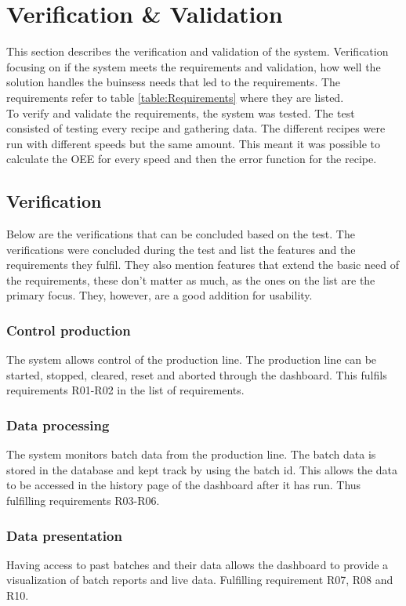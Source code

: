 \section{Verification \& Validation}
This section describes the verification and validation of the system. 
Verification focusing on if the system meets the requirements and validation, 
how well the solution handles the buinsess needs that led to the requirements.
The requirements refer to table \ref{table:Requirements} where they are listed. \\

To verify and validate the requirements, the system was tested. The test 
consisted of testing every recipe and gathering data. The different recipes were 
run with different speeds but the same amount. This meant it was possible to 
calculate the OEE for every speed and then the error function for the recipe. 

\subsection{Verification}
Below are the verifications that can be concluded based on the test. The 
verifications were concluded during the test and list the features and the 
requirements they fulfil. They also mention features that extend the basic need 
of the requirements, these don't matter as much, as the ones on the list are the 
primary focus. They, however, are a good addition for usability.

\subsubsection{Control production} 
The system allows control of the production line. The production line can be 
started, stopped, cleared, reset and aborted through the dashboard. This fulfils 
requirements R01-R02 in the list of requirements.

\subsubsection{Data processing}
The system monitors batch data from the production line. The batch data is 
stored in the database and kept track by using the batch id. This allows the 
data to be accessed in the history page of the dashboard after it has run. Thus 
fulfilling requirements R03-R06.

\subsubsection{Data presentation}
Having access to past batches and their data allows the dashboard to provide a 
visualization of batch reports and live data. Fulfilling requirement R07, R08 
and R10.

